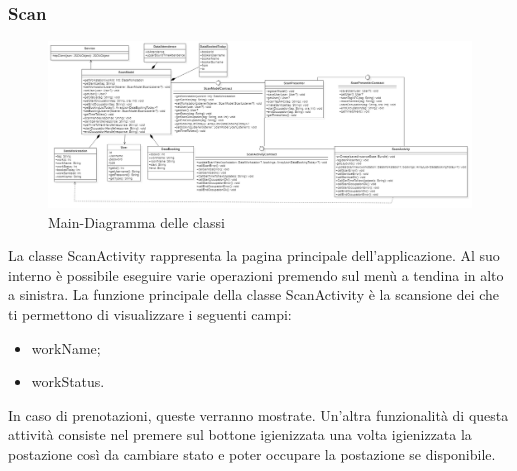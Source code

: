 \subsubsection{Scan}
\begin{figure}[H]
	\centering
	\includegraphics[width=16cm]{res/images/apputenti-MainClass.png}
	\caption{Main-Diagramma delle classi}
	\label{fig:Main-Diagramma delle classi}
\end{figure}
La classe ScanActivity rappresenta la pagina principale dell'applicazione. Al suo interno è possibile eseguire varie operazioni premendo sul menù a tendina in alto a sinistra.
La funzione principale della classe ScanActivity è la scansione dei  che ti permettono di visualizzare i seguenti campi:
\begin{itemize}
	\item workName; 
	\item workStatus. 
\end{itemize}
In caso di prenotazioni, queste verranno mostrate.
Un'altra funzionalità di questa attività consiste nel premere sul bottone igienizzata una volta igienizzata la postazione così da cambiare stato e poter occupare la postazione se disponibile.

